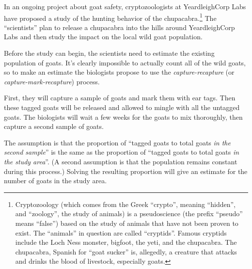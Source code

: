 In an ongoing project about goat safety, cryptozoologists at YeardleighCorp Labs have proposed a study of the hunting behavior of the chupacabra.\footnote{Cryptozoology (which comes from the Greek ``crypto'', meaning ``hidden'', and ``zoology'', the study of animals) is a pseudoscience (the prefix ``pseudo'' means ``false'') based on the study of animals that have not been proven to exist. The ``animals'' in question are called ``cryptids''. Famous cryptids include the Loch Ness monster, bigfoot, the yeti, and the chupacabra. The chupacabra, Spanish for ``goat sucker'' is, allegedly, a creature that attacks and drinks the blood of livestock, especially goats.} The ``scientists'' plan to release a chupacabra into the hills around YeardleighCorp Labs and then study the impact on the local wild goat population.


Before the study can begin, the scientists need to estimate the existing population of goats. It's clearly impossible to actually count all of the wild goats, so to make an estimate the biologists propose to use the \textit{capture-recapture} (or \textit{capture-mark-recapture}) process.

First, they will capture a sample of goats and mark them with ear tags. Then these tagged goats will be released and allowed to mingle with all the untagged goats. The biologists will wait a few weeks for the goats to mix thoroughly, then capture a second sample of goats.

The assumption is that the proportion of ``tagged goats to total goats \textit{in the second sample}'' is the same as the proportion of ``tagged goats to total goats \textit{in the study area}''. (A second assumption is that the population remains constant during this process.) Solving the resulting proportion will give an estimate for the number of goats in the study area.

